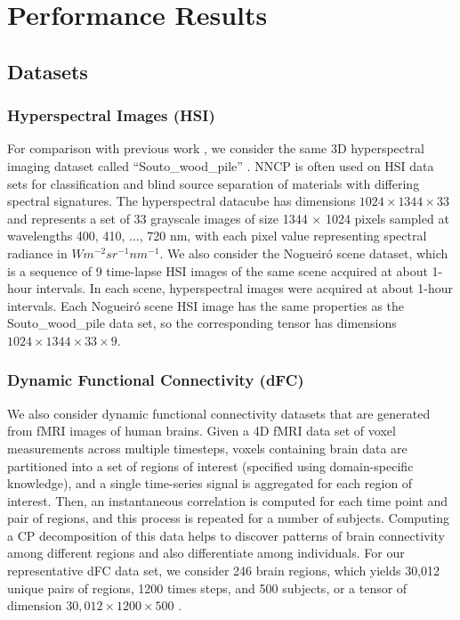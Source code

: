 
\section{Performance Results} \label{sec:experiments}



\subsection{Datasets}


\subsubsection{Hyperspectral Images (HSI)}
For comparison with previous work \cite{LK+17b}, we consider the same 3D hyperspectral imaging dataset called ``Souto\_wood\_pile'' \cite{FAN16}. 
NNCP is often used on HSI data sets for classification and blind source separation of materials with differing spectral signatures.
The hyperspectral datacube has dimensions $1024 \times 1344 \times 33$ and represents a set of 33 grayscale images of size 1344 $\times$ 1024 pixels sampled at wavelengths 400, 410, $\dots$, 720 nm, with each pixel value representing spectral radiance in $W m^{-2} sr^{-1} nm^{-1}$. 
We also consider the Nogueir\'{o} scene dataset, which is a sequence of 9 time-lapse HSI images of the same scene acquired at about 1-hour intervals.
In each scene, hyperspectral images were acquired at about 1-hour intervals. 
Each Nogueir\'{o} scene HSI image has the same properties as the Souto\_wood\_pile data set, so the corresponding tensor has dimensions $1024 \times 1344 \times 33 \times 9$. 

\subsubsection{Dynamic Functional Connectivity (dFC)}
We also consider dynamic functional connectivity datasets that are generated from fMRI images of human brains.
Given a 4D fMRI data set of voxel measurements across multiple timesteps, voxels containing brain data are partitioned into a set of regions of interest (specified using domain-specific knowledge), and a single time-series signal is aggregated for each region of interest.
Then, an instantaneous correlation is computed for each time point and pair of regions, and this process is repeated for a number of subjects.
Computing a CP decomposition of this data helps to discover patterns of brain connectivity among different regions and also differentiate among individuals.
For our representative dFC data set, we consider 246 brain regions, which yields 30{,}012 unique pairs of regions, 1200 times steps, and 500 subjects, or a tensor of dimension $30{,}012\times 1200 \times 500$ \cite{VEU+12,THBGW17}.

